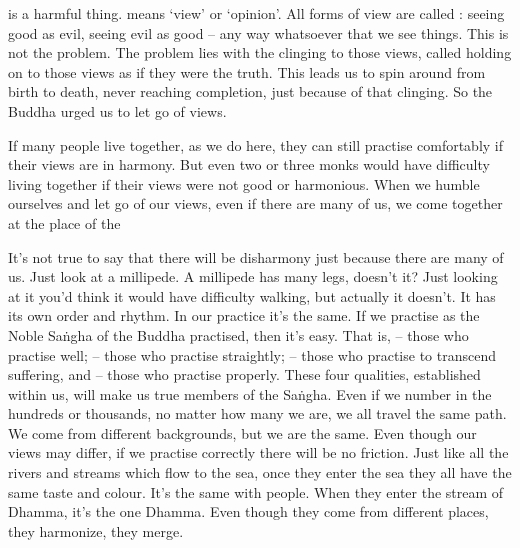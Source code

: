 is a harmful thing.  means `view' or `opinion'. All forms of view are called : seeing good as evil, seeing evil as good -- any way whatsoever that we see things. This is not the problem. The problem lies with the clinging to those views, called  holding on to those views as if they were the truth. This leads us to spin around from birth to death, never reaching completion, just because of that clinging. So the Buddha urged us to let go of views. 

If many people live together, as we do here, they can still practise comfortably if their views are in harmony. But even two or three monks would have difficulty living together if their views were not good or harmonious. When we humble ourselves and let go of our views, even if there are many of us, we come together at the place of the 

It's not true to say that there will be disharmony just because there are many of us. Just look at a millipede. A millipede has many legs, doesn't it? Just looking at it you'd think it would have difficulty walking, but actually it doesn't. It has its own order and rhythm. In our practice it's the same. If we practise as the Noble Sa\.ngha of the Buddha practised, then it's easy. That is,  -- those who practise well;  -- those who practise straightly;  -- those who practise to transcend suffering, and  -- those who practise properly. These four qualities, established within us, will make us true members of the Sa\.ngha. Even if we number in the hundreds or thousands, no matter how many we are, we all travel the same path. We come from different backgrounds, but we are the same. Even though our views may differ, if we practise correctly there will be no friction. Just like all the rivers and streams which flow to the sea, once they enter the sea they all have the same taste and colour. It's the same with people. When they enter the stream of Dhamma, it's the one Dhamma. Even though they come from different places, they harmonize, they merge. 

